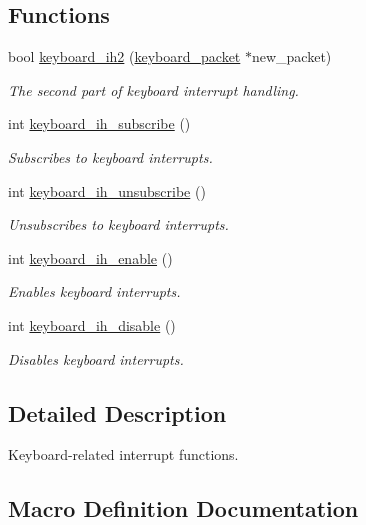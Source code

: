 \subsection*{Functions}
\begin{DoxyCompactItemize}
\item 
bool \hyperlink{group__keyboard_ga92937e5072f297d330bd57bb62cd35fb}{keyboard\+\_\+ih2} (\hyperlink{structkeyboard__packet}{keyboard\+\_\+packet} $\ast$new\+\_\+packet)
\begin{DoxyCompactList}\small\item\em The second part of keyboard interrupt handling. \end{DoxyCompactList}\item 
int \hyperlink{group__keyboard_ga73e07d998291eb412f8097fd06ddafa8}{keyboard\+\_\+ih\+\_\+subscribe} ()
\begin{DoxyCompactList}\small\item\em Subscribes to keyboard interrupts. \end{DoxyCompactList}\item 
int \hyperlink{group__keyboard_gae7dcc7462f98df72164f4a194125d0e9}{keyboard\+\_\+ih\+\_\+unsubscribe} ()
\begin{DoxyCompactList}\small\item\em Unsubscribes to keyboard interrupts. \end{DoxyCompactList}\item 
int \hyperlink{group__keyboard_gad416a0ec7ca419806341ab7be70064b1}{keyboard\+\_\+ih\+\_\+enable} ()
\begin{DoxyCompactList}\small\item\em Enables keyboard interrupts. \end{DoxyCompactList}\item 
int \hyperlink{group__keyboard_ga803d759506fefe9119ad529c783b3a7a}{keyboard\+\_\+ih\+\_\+disable} ()
\begin{DoxyCompactList}\small\item\em Disables keyboard interrupts. \end{DoxyCompactList}\end{DoxyCompactItemize}


\subsection{Detailed Description}
Keyboard-\/related interrupt functions. 



\subsection{Macro Definition Documentation}
\mbox{\label{group__keyboard_ga03c0bb70d0f678541f822faab96376bc}} 
